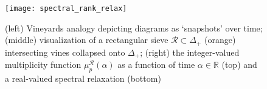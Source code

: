\documentclass[10pt]{article}
\numberwithin{equation}{section}
\newcommand{\+}{%
	\raisebox{0.18ex}{\scaleobj{0.55}{+}}
}
\theoremstyle{definition}
\theoremstyle{definition}
\begin{document}
\noindent 


\begin{figure}\label{fig:overview}
\centering
\texttt{[image: spectral\_rank\_relax]}	
\caption{ (left) Vineyards analogy depicting diagrams as `snapshots' over time; (middle) visualization of a rectangular sieve $\mathcal{R} \subset \Delta_+$ (orange) intersecting vines collapsed onto $\Delta_+$; 
(right) the integer-valued multiplicity function $\mu_p^{\mathcal{R}}(\alpha)$ 
as a function of time $\alpha \in \mathbb{R}$ (top) and a real-valued spectral relaxation (bottom)
}
\end{figure}


\end{document}
